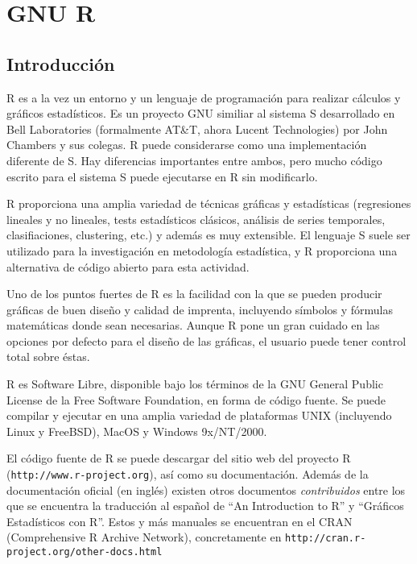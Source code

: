 
\chapter{GNU R}
\label{r.tex}


\section{Introducción}


{\sf R}  es a  la vez un  entorno y un  lenguaje de  programación para
realizar cálculos y gráficos estadísticos. Es un proyecto GNU similiar
al  sistema {\sf  S}  desarrollado en  Bell Laboratories  (formalmente
AT\&T, ahora  Lucent Technologies)  por John  Chambers y  sus colegas.
{\sf R} puede  considerarse como una implementación  diferente de {\sf
S}. Hay diferencias importantes entre ambos, pero mucho código escrito
para el sistema {\sf S} puede ejecutarse en {\sf R} sin modificarlo.

{\sf  R}  proporciona  una  amplia  variedad de  técnicas  gráficas  y
estadísticas (regresiones  lineales y no lineales,  tests estadísticos
clásicos, análisis  de series temporales,  clasifiaciones, clustering,
etc.)  y además  es  muy extensible.  El lenguaje  {\sf  S} suele  ser
utilizado para la investigación en  metodología estadística, y {\sf R}
proporciona una alternativa de código abierto para esta actividad.

Uno de  los puntos fuertes de  {\sf R} es  la facilidad con la  que se
pueden  producir  gráficas  de  buen diseño  y  calidad  de  imprenta,
incluyendo  símbolos y  fórmulas  matemáticas  donde sean  necesarias.
Aunque {\sf R}  pone un gran cuidado en las  opciones por defecto para
el diseño de las gráficas, el  usuario puede tener control total sobre
éstas.

{\sf R}  es Software  Libre, disponible  bajo los  términos de  la GNU
General Public  License de  la Free Software  Foundation, en  forma de
código fuente. Se puede compilar y  ejecutar en una amplia variedad de
plataformas  UNIX  (incluyendo  Linux  y  FreeBSD),  MacOS  y  Windows
9x/NT/2000.

El  código  fuente  de  {\sf  R} se  puede  descargar  del  sitio  web
del  proyecto {\sf  R} ({\tt  http://www.r-project.org}), así  como su
documentación. Además de la  documentación oficial (en inglés) existen
otros  documentos {\em  contribuidos} entre  los que  se encuentra  la
traducción  al  español  de  ``An Introduction  to  R''  y  ``Gráficos
Estadísticos con R''.   Estos y más manuales se
encuentran en el CRAN (Comprehensive R Archive Network), concretamente
en {\tt http://cran.r-project.org/other-docs.html}

